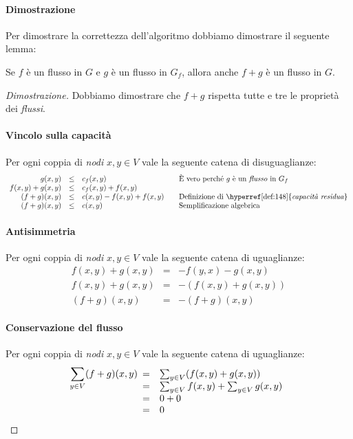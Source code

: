 \paragraph{Dimostrazione}
Per dimostrare la correttezza dell'algoritmo dobbiamo dimostrare il seguente
lemma:

\begin{definition}
    Se $f$ è un flusso in $G$ e $g$ è un flusso in $G_f$, allora anche $f+g$ è
    un flusso in $G$.
\end{definition}
\begin{proof}[Dimostrazione]
    Dobbiamo dimostrare che $f+g$ rispetta tutte e tre le proprietà dei
    \emph{flussi}.

    \paragraph{Vincolo sulla capacità}
    Per ogni coppia di \emph{nodi} $x,y\in V$ vale la seguente catena di
    disuguaglianze:
    \[\begin{array}{rcll}
        g(x,y) & \leq & c_f(x,y) & \quad\text{È vero perché $g$ è un
            \emph{flusso} in $G_f$}\\
        f(x,y)+g(x,y) & \leq & c_f(x,y)+f(x,y)\\
        (f+g)(x,y) &  \leq & c(x,y)-f(x,y)+f(x,y) & \quad\text{Definizione di
            \hyperref[def:148]{\emph{capacità residua}}}\\
        (f+g)(x,y) & \leq & c(x,y) & \quad\text{Semplificazione algebrica}
    \end{array}\]

    \paragraph{Antisimmetria}
    Per ogni coppia di \emph{nodi} $x,y\in V$ vale la seguente catena di
    uguaglianze:
    \[\begin{array}{rcll}
        f(x,y)+g(x,y) & = & -f(y,x)-g(x,y)\\
        f(x,y)+g(x,y) & = & -(f(x,y)+g(x,y))\\
        (f+g)(x,y) & = & -(f+g)(x,y)
    \end{array}\]

    \paragraph{Conservazione del flusso}
    Per ogni coppia di \emph{nodi} $x,y\in V$ vale la seguente catena di
    uguaglianze:
    \[\sum_{y\in V}(f+g)(x,y)\begin{array}[t]{cl}
        = & \sum_{y\in V}(f(x,y)+g(x,y))\\
        = & \sum_{y\in V}f(x,y)+\sum_{y\in V}g(x,y)\\
        = & 0 + 0\\
        = & 0
    \end{array}\]
\end{proof}

